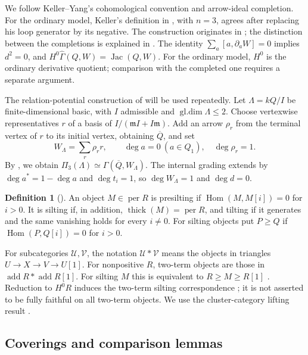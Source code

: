 \documentclass[12pt,a4paper,english,reqno]{amsart}
\theoremstyle{plain}
\theoremstyle{definition}
\newtheorem{dfn*}[thm]{Definition}
\numberwithin{equation}{section}
\def\ro{\rho}
\def\Ga{\Gamma}
\def\La{\Lambda}
\def\Hom{\operatorname{Hom}}
\def\thick{\operatorname{thick}}
\def\add{\operatorname{add}}
\def\perf{\operatorname{per}}
\def\Jac{\operatorname{Jac}}
\begin{document}
We follow Keller--Yang's cohomological convention and arrow-ideal
completion. For the ordinary model, Keller's definition in
\cite[Section 6.2]{Keller}, with $n=3$, agrees after replacing his
loop generator by its negative. The construction originates in
\cite{Ginzburg}; the distinction between the completions is explained
in \cite[Remark 2.7]{KY}.
The identity $\sum_a[a,\partial_aW]=0$ implies $d^2=0$, and
$H^0\widehat\Ga(Q,W)=\Jac(Q,W)$. For the ordinary model, $H^0$
is the ordinary derivative quotient; comparison with the completed
one requires a separate argument.

The relation-potential construction of \cite[Section 6.9]{Keller}
will be used repeatedly. Let $\La=kQ/I$ be finite-dimensional basic,
with $I$ admissible and $\operatorname{gl.dim}\La\le2$.
Choose vertexwise representatives $r$ of a basis of
$I/(\mathfrak m I+I\mathfrak m)$. Add an arrow $\ro_r$ from the
terminal vertex of $r$ to its initial vertex, obtaining $\overline Q$,
and set
\[
 W_\La=\sum_r\ro_r r,\qquad
 \deg a=0\ (a\in Q_1),\quad \deg\ro_r=1.
\]
By \cite[Theorem 6.10]{Keller}, we obtain
$\Pi_3(\La)\simeq\Ga(\overline Q,W_\La)$.
The internal grading extends by
$\deg a^*=1-\deg a$ and $\deg t_i=1$, so $\deg W_\La=1$
and $\deg d=0$.

\begin{dfn*}[{\cite[Definitions 2.1 and 2.10]{AI}}]\label{def:silting}
An object $M\in\perf R$ is presilting if
$\Hom(M,M[i])=0$ for $i>0$. It is silting if, in addition,
$\thick(M)=\perf R$, and tilting if it generates and the same
vanishing holds for every $i\ne0$. For silting objects put
$P\ge Q$ if $\Hom(P,Q[i])=0$ for $i>0$.
\end{dfn*}

For subcategories $\mathcal U,\mathcal V$, the notation
$\mathcal U*\mathcal V$ means the objects in triangles
$U\to X\to V\to U[1]$. For nonpositive $R$, two-term objects are
those in $\add R*\add R[1]$. For silting $M$ this is equivalent
to $R\ge M\ge R[1]$ \cite[Proposition 2.23]{AI}.
Reduction to $H^0R$ induces the two-term silting correspondence
\cite[Proposition 3.2(a)]{XYZ}; it is not asserted to be fully
faithful on all two-term objects. We use the cluster-category lifting
result \cite[Theorem 5.2]{HI}.

\subsection{Coverings and comparison lemmas}\label{subsec:silting-coverings}
\end{document}

